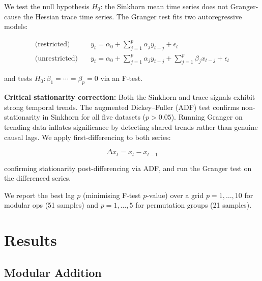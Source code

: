 \documentclass[12pt,twoside]{article}
\begin{document}
We test the null hypothesis $H_0$: the Sinkhorn mean time series does not
Granger-cause the Hessian trace time series. The Granger test
\citep{granger1969investigating} fits two autoregressive models:

\begin{align}
  \text{(restricted)} &\quad y_t = \alpha_0 + \sum_{j=1}^p \alpha_j y_{t-j} + \epsilon_t \\
  \text{(unrestricted)} &\quad y_t = \alpha_0 + \sum_{j=1}^p \alpha_j y_{t-j}
    + \sum_{j=1}^p \beta_j x_{t-j} + \epsilon_t
  \label{eq:granger}
\end{align}

and tests $H_0: \beta_1 = \cdots = \beta_p = 0$ via an F-test.

\textbf{Critical stationarity correction:}
Both the Sinkhorn and trace signals exhibit strong temporal trends.
The augmented Dickey--Fuller (ADF) test confirms non-stationarity in
Sinkhorn for all five datasets ($p > 0.05$). Running Granger on trending
data inflates significance by detecting shared trends rather than genuine
causal lags. We apply first-differencing to both series:

\begin{equation}
  \Delta x_t = x_t - x_{t-1}
  \label{eq:difference}
\end{equation}

confirming stationarity post-differencing via ADF, and run the Granger test
on the differenced series.

We report the best lag $p$ (minimising F-test $p$-value) over a grid
\(p = 1, \ldots, 10\) for modular ops (51 samples) and
\(p = 1, \ldots, 5\) for permutation groups (21 samples).

\section{Results}
\label{sec:results}

\subsection{Modular Addition}
\end{document}
